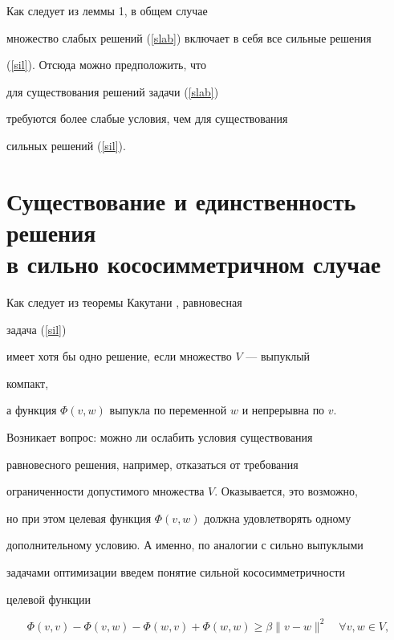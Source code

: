 Как следует из леммы 1, в общем случае


множество слабых решений (\ref{slab}) включает  в себя все сильные решения


(\ref{sil}). Отсюда можно предположить, что


для существования решений задачи (\ref{slab})


требуются более слабые условия, чем для существования


сильных решений (\ref{sil}).





\section{Существование и единственность решения \protect\\


в сильно кососимметричном случае}





Как следует из теоремы Какутани \cite{oben}, равновесная


задача (\ref{sil})


имеет хотя бы одно решение, если  множество $V$ --- выпуклый


компакт,


а функция $\Phi(v,w)$ выпукла по переменной $w$ и непрерывна по $v$.





Возникает вопрос: можно ли ослабить условия существования


равновесного решения, например, отказаться от требования


ограниченности допустимого множества $V$. Оказывается, это возможно,


но при этом целевая функция $\Phi(v,w)$ должна удовлетворять одному


дополнительному условию. А именно, по аналогии с сильно выпуклыми


задачами оптимизации введем понятие сильной кососимметричности 


целевой функции


\begin{equation}\label{sil-kos}


\Phi(v,v) -\Phi(v,w) -\Phi(w,v) + \Phi(w,w) \geq


\beta\|v-w\|^2\quad \forall v, w\in V,


\end{equation}


